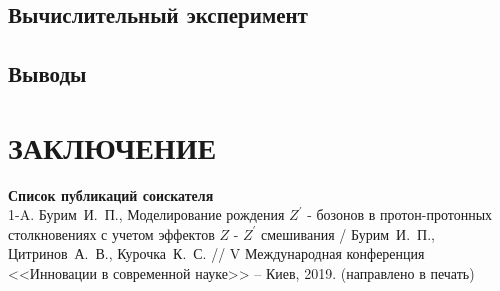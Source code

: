 \documentclass[12pt,a4paper]{styles/report}
\begin{document}
\section{Вычислительный эксперимент}

\section{Выводы}


\newpage
\chapter*{ЗАКЛЮЧЕНИЕ}


\newpage
{}
\begin{thebibliography}{9999.}

\end{thebibliography}

\vspace{2cm}
\textbf{Список публикаций соискателя}\\

1-A. Бурим~И.~П., Моделирование рождения $Z^\prime$ - бозонов в протон-протонных столкновениях с учетом эффектов $Z$ - $Z^\prime$ смешивания / Бурим~И.~П., Цитринов~А.~В., Курочка~К.~С. // V Международная конференция <<Инновации в современной науке>> -- Киев, 2019. (направлено в печать)


\newpage

\end{document}

